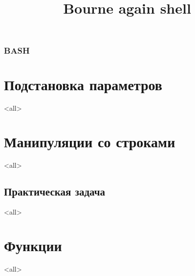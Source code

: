 
\title[bash]{Bourne again shell}




\begin{frame}
	\frametitle{BASH}
	\titlepage
	\vspace{-0.5cm}
	\begin{center}
	\end{center}
\end{frame}

\begin{frame}
	\tableofcontents
\end{frame}




\section{Подстановка параметров}

\mode<all>{}

\section{Манипуляции со строками}

\mode<all>{}

\subsection{Практическая задача}

\mode<all>{}

\section{Функции}

\mode<all>{}


